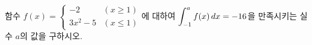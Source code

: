함수 $f(x)=\begin{cases} -2 & (x\ge 1) \\ 3x^2-5 & (x\le 1) \end{cases}$에 대하여 $\displaystyle\int_{-1}^{a}f(x)\mkern3mu dx=-16$을 만족시키는 실수 $a$의 값을 구하시오. 
